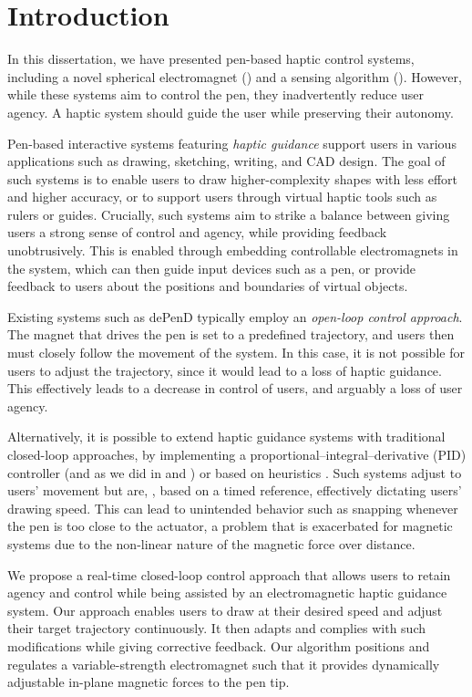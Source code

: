 \section{Introduction}
In this dissertation, we have presented pen-based haptic control systems, including a novel spherical electromagnet () and a sensing algorithm (). However, while these systems aim to control the pen, they inadvertently reduce user agency. A haptic system should guide the user while preserving their autonomy.

Pen-based interactive systems featuring \textit{haptic guidance} support users in various applications such as drawing, sketching, writing, and CAD design. The goal of such systems is to enable users to draw higher-complexity shapes with less effort and higher accuracy, or to support users through virtual haptic tools such as rulers or guides. Crucially, such systems aim to strike a balance between giving users a strong sense of control and agency, while providing feedback unobtrusively. This is enabled through embedding controllable electromagnets in the system, which can then guide input devices such as a pen, or provide feedback to users about the positions and boundaries of virtual objects.

Existing systems such as dePenD \cite{yamaoka2013depend} typically employ an \textit{open-loop control approach}. The magnet that drives the pen is set to a predefined trajectory, and users then must closely follow the movement of the system. In this case, it is not possible for users to adjust the trajectory, since it would lead to a loss of haptic guidance. This effectively leads to a decrease in control of users, and arguably a loss of user agency.

Alternatively, it is possible to extend haptic guidance systems with traditional closed-loop approaches, \eg by implementing a proportional–integral–derivative (PID) controller \cite{aastrom1995pid} (and as we did in \omniHap and \omniUIST) or based on heuristics \cite{Lopes16}. Such systems adjust to users' movement but are, , based on a timed reference, effectively dictating users' drawing speed. This can lead to unintended behavior such as snapping whenever the pen is too close to the actuator, a problem that is exacerbated for magnetic systems due to the non-linear nature of the magnetic force over distance.

We propose a real-time closed-loop control approach that allows users to retain agency and control while being assisted by an electromagnetic haptic guidance system. Our approach enables users to draw at their desired speed and adjust their target trajectory continuously.
It then adapts and complies with such modifications while giving corrective feedback. Our algorithm positions and regulates a variable-strength electromagnet such that it provides dynamically adjustable in-plane magnetic forces to the pen tip.

